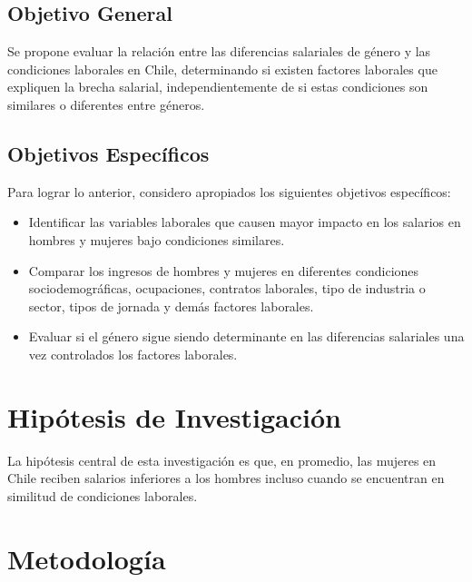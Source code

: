 \subsection{Objetivo General}


Se propone evaluar la relación entre las diferencias salariales de género y las condiciones laborales en Chile, determinando si existen factores laborales que expliquen la brecha salarial, independientemente de si estas condiciones son similares o diferentes entre géneros.

\subsection{Objetivos Específicos}


Para lograr lo anterior, considero apropiados los siguientes objetivos específicos:

\begin{itemize}
    \item Identificar las variables laborales que causen mayor impacto en los salarios en hombres y mujeres bajo condiciones similares.
    \item Comparar los ingresos de hombres y mujeres en diferentes condiciones sociodemográficas, ocupaciones,  contratos laborales, tipo de industria o sector, tipos de jornada y demás factores laborales.
    \item Evaluar si el género sigue siendo determinante en las diferencias salariales una vez controlados los factores laborales.
\end{itemize}

\section{Hipótesis de Investigación}

La hipótesis central de esta investigación es que, en promedio, las mujeres en Chile reciben salarios inferiores a los hombres incluso cuando se encuentran en similitud de condiciones laborales.

\section{Metodología} 

